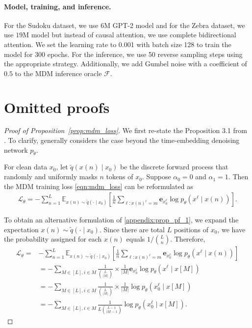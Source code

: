 \paragraph{Model, training, and inference.} For the Sudoku dataset, we use $6$M GPT-2 model and for the Zebra dataset, we use $19$M model but instead of causal attention, we use complete bidirectional attention. We set the learning rate to 0.001 with batch size 128 to train the model for 300 epochs. For the inference, we use 50 reverse sampling steps using the appropriate strategy. Additionally, we add Gumbel noise with a coefficient of $0.5$ to the MDM inference oracle $\mathcal F$.



\section{Omitted proofs}
\label{appenix:mdm-equivalent-loss}

\begin{proof}[Proof of Proposition~\ref{prop:mdm_loss}]
We first re-state the Proposition 3.1 from \cite{zheng2024maskeddiffusionmodelssecretly}. To clarify, \cite{zheng2024maskeddiffusionmodelssecretly} generally considers the case beyond the time-embedding denoising network $p_\theta$. 
\begin{proposition}
For clean data $x_0$, let $\tilde{q}(x(n)\mid x_0)$ be the discrete forward process that randomly and uniformly masks $n$ tokens of $x_0$.
Suppose $\alpha_0 = 0$ and $\alpha_1 = 1$. Then the MDM training loss \eqref{eqn:mdm_loss} can be reformulated as
\begin{align} \label{appendix:prop_pf_1}
    \mathcal{L}_\theta = - \sum_{n=1}^L \mathbb{E}_{x(n)\sim \tilde{q}(\cdot\mid x_0)}\left[\frac{1}{n}\sum_{\ell:x(n)^\ell = m}  \mathbf{e}_{x_0^\ell} \log p_\theta(x^\ell\mid x(n))\right].
\end{align}
\end{proposition}
To obtain an alternative formulation of \eqref{appendix:prop_pf_1}, we expand the expectation $x(n)\sim \tilde{q}(\cdot\mid x_0)$. Since there are total $L$ positions of $x_0$, we have the probability assigned for each $x(n)$ equals $1/\binom{L}{n}$. Therefore, 
\begin{align*}
      \mathcal{L}_\theta =& - \sum_{n=1}^L \mathbb{E}_{x(n) \sim \tilde{q}(\cdot\mid x_0)}\left[\frac{1}{n}\sum_{\ell:x(n)^\ell = m}  \mathbf{e}_{x_0^\ell} \log p_\theta(x^\ell\mid x(n))\right] \\
      & = -\sum_{M \in [L], i \in M} \frac{1}{\binom{L}{|M|}} \times \frac{1}{|M|}\mathbf{e}_{x_0^\ell} \log p_\theta(x^\ell\mid x[M]) \\
      & = -\sum_{M \in [L], i \in M} \frac{1}{\binom{L}{|M|}} \times \frac{1}{|M|} \log p_\theta(x_0^\ell\mid x[M]) \\
      & = -\sum_{M \in [L], i \in M} \frac{1}{L\binom{L-1}{|M|-1}} \log p_\theta(x_0^\ell\mid x[M]).
\end{align*}
\end{proof}



